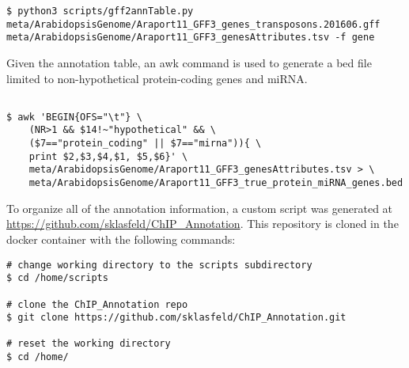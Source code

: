 \documentclass{article}
\begin{document}
\begin{sloppypar}
\begin{verbatim}
$ python3 scripts/gff2annTable.py meta/ArabidopsisGenome/Araport11_GFF3_genes_transposons.201606.gff meta/ArabidopsisGenome/Araport11_GFF3_genesAttributes.tsv -f gene
\end{verbatim}

Given the annotation table, an awk command is used to generate a bed file limited to non-hypothetical protein-coding genes and miRNA.

\begin{verbatim}

$ awk 'BEGIN{OFS="\t"} \
    (NR>1 && $14!~"hypothetical" && \
    ($7=="protein_coding" || $7=="mirna")){ \
    print $2,$3,$4,$1, $5,$6}' \
    meta/ArabidopsisGenome/Araport11_GFF3_genesAttributes.tsv > \
    meta/ArabidopsisGenome/Araport11_GFF3_true_protein_miRNA_genes.bed
\end{verbatim}

To organize all of the annotation information, a custom script was generated at \url{https://github.com/sklasfeld/ChIP_Annotation}. This repository is cloned in the docker container with the following commands:
\begin{verbatim}
# change working directory to the scripts subdirectory
$ cd /home/scripts

# clone the ChIP_Annotation repo
$ git clone https://github.com/sklasfeld/ChIP_Annotation.git

# reset the working directory
$ cd /home/
\end{verbatim}


\end{sloppypar}
\end{document}
